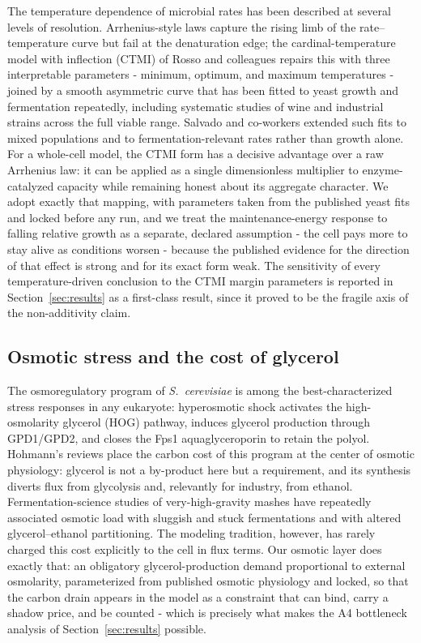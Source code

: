 \documentclass[12pt]{article}
\begin{document}
The temperature dependence of microbial rates has been described at
several levels of resolution. Arrhenius-style laws capture the rising
limb of the rate--temperature curve but fail at the denaturation edge;
the cardinal-temperature model with inflection (CTMI) of Rosso and
colleagues repairs this with three interpretable parameters - minimum,
optimum, and maximum temperatures - joined by a smooth asymmetric curve
that has been fitted to yeast growth and fermentation repeatedly,
including systematic studies of wine and industrial strains across the
full viable range. Salvado and co-workers extended such fits to mixed
populations and to fermentation-relevant rates rather than growth alone.
For a whole-cell model, the CTMI form has a decisive advantage over a raw
Arrhenius law: it can be applied as a single dimensionless multiplier to
enzyme-catalyzed capacity while remaining honest about its aggregate
character. We adopt exactly that mapping, with parameters taken from the
published yeast fits and locked before any run, and we treat the
maintenance-energy response to falling relative growth as a separate,
declared assumption - the cell pays more to stay alive as conditions
worsen - because the published evidence for the direction of that effect
is strong and for its exact form weak. The sensitivity of every
temperature-driven conclusion to the CTMI margin parameters is reported
in Section~\ref{sec:results} as a first-class result, since it proved to
be the fragile axis of the non-additivity claim.

\subsection{Osmotic stress and the cost of glycerol}

The osmoregulatory program of \emph{S.\ cerevisiae} is among the
best-characterized stress responses in any eukaryote: hyperosmotic shock
activates the high-osmolarity glycerol (HOG) pathway, induces glycerol
production through GPD1/GPD2, and closes the Fps1 aquaglyceroporin to
retain the polyol. Hohmann's reviews place the carbon cost of this program
at the center of osmotic physiology: glycerol is not a by-product here but
a requirement, and its synthesis diverts flux from glycolysis and,
relevantly for industry, from ethanol. Fermentation-science studies of
very-high-gravity mashes have repeatedly associated osmotic load with
sluggish and stuck fermentations and with altered glycerol--ethanol
partitioning. The modeling tradition, however, has rarely charged this
cost explicitly to the cell in flux terms. Our osmotic layer does exactly
that: an obligatory glycerol-production demand proportional to external
osmolarity, parameterized from published osmotic physiology and locked,
so that the carbon drain appears in the model as a constraint that can
bind, carry a shadow price, and be counted - which is precisely what
makes the A4 bottleneck analysis of Section~\ref{sec:results} possible.
\end{document}
